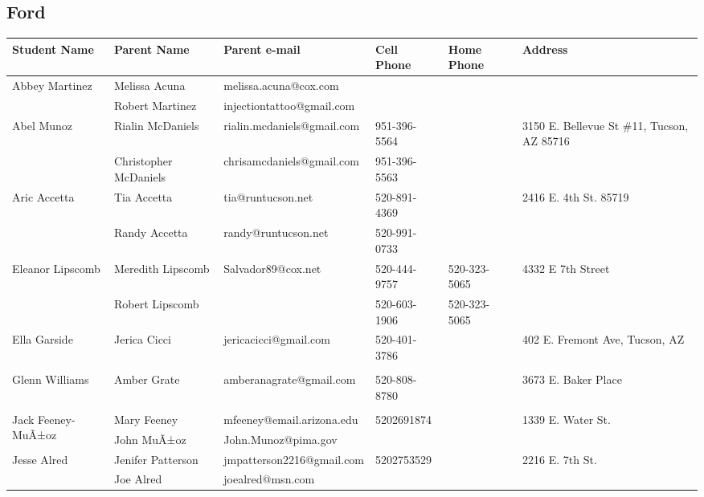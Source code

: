 \documentclass[landscape]{article}\usepackage[]{graphicx}\usepackage[]{color}
\begin{document}
\subsection{Ford}
\begin{longtable}{|p{100pt}|p{100pt}|p{140pt}|p{60pt}|p{64pt}|p{120pt}|}
\textbf{Student Name} & \textbf{Parent Name} & \textbf{Parent e-mail} & \textbf{Cell Phone} & \textbf{Home Phone} & \textbf{Address}\\
\hline
\hline
\multirow{2}{100pt}{Abbey Martinez} & Melissa Acuna & melissa.acuna@cox.com &  &  & \multirow{2}{120pt}{} \\
 & Robert Martinez & injectiontattoo@gmail.com &  &  & \\
\hline
\multirow{2}{100pt}{Abel Munoz} & Rialin McDaniels & rialin.mcdaniels@gmail.com & 951-396-5564 &  & \multirow{2}{120pt}{3150 E. Bellevue St \#11, Tucson, AZ 85716} \\
 & Christopher McDaniels & chrisamcdaniels@gmail.com & 951-396-5563 &  & \\
\hline
\multirow{2}{100pt}{Aric Accetta} & Tia Accetta & tia@runtucson.net & 520-891-4369 &  & \multirow{2}{120pt}{2416 E. 4th St. 85719} \\
 & Randy Accetta & randy@runtucson.net & 520-991-0733 &  & \\
\hline
\multirow{2}{100pt}{Eleanor Lipscomb} & Meredith Lipscomb & Salvador89@cox.net & 520-444-9757 & 520-323-5065 & \multirow{2}{120pt}{4332 E 7th Street} \\
 & Robert Lipscomb &  & 520-603-1906 & 520-323-5065 & \\
\hline
\multirow{2}{100pt}{Ella Garside} & Jerica Cicci & jericacicci@gmail.com & 520-401-3786 &  & \multirow{2}{120pt}{402 E. Fremont Ave, Tucson, AZ } \\
 &  &  &  &  & \\
\hline
\multirow{2}{100pt}{Glenn Williams} & Amber Grate & amberanagrate@gmail.com & 520-808-8780 &  & \multirow{2}{120pt}{3673 E. Baker Place} \\
 &  &  &  &  & \\
\hline
\multirow{2}{100pt}{Jack Feeney-MuÃ±oz} & Mary Feeney & mfeeney@email.arizona.edu & 5202691874 &  & \multirow{2}{120pt}{1339 E. Water St.} \\
 & John MuÃ±oz & John.Munoz@pima.gov &  &  & \\
\hline
\multirow{2}{100pt}{Jesse Alred} & Jenifer Patterson & jmpatterson2216@gmail.com & 5202753529 &  & \multirow{2}{120pt}{2216 E. 7th St.} \\
 & Joe Alred & joealred@msn.com &  &  & \\

\end{longtable}
\end{document}
